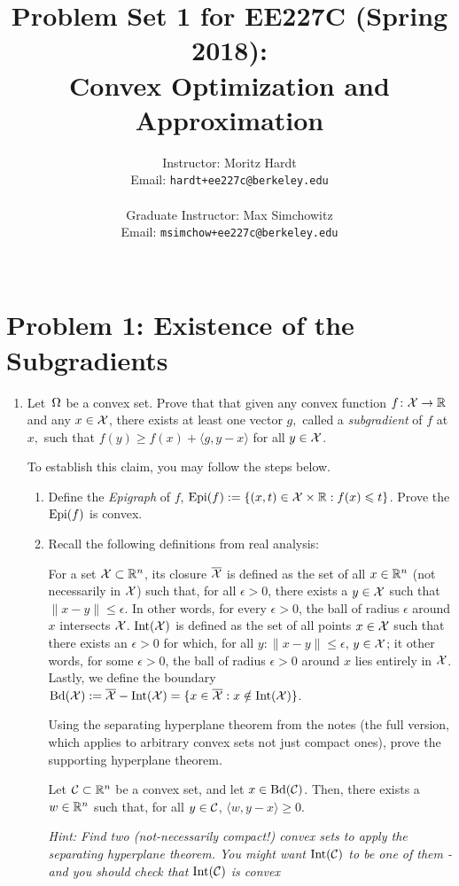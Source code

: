 \documentclass[12pt]{article}
\title{Problem Set 1 for EE227C (Spring 2018):\\
 Convex Optimization and Approximation }
\author{Instructor: Moritz Hardt\\
{\small Email: \tt hardt+ee227c@berkeley.edu}\\ ~\\
Graduate Instructor: Max Simchowitz\\
{\small Email: \tt msimchow+ee227c@berkeley.edu}\\ ~\\
}
\begin{document}


\maketitle

\section*{Problem 1: Existence of the Subgradients}
\begin{enumerate}
\item
Let~$\Omega$ be a convex set. Prove that that given any convex function $f\colon{\cal X} \to
\mathbb{R}$ and any $x \in {\cal X}$, there exists at least one vector $g,$ called a
\emph{subgradient} of $f$ at $x,$ such that $f(y) \ge f(x) + \langle g, y - x
\rangle$ for all $y \in {\cal X}$. 

To establish this claim, you may follow the steps below.

\begin{enumerate}
\item
Define the \emph{Epigraph} of $f$, $\mathrm{Epi}(f) := \{(x,t) \in {\cal X}
\times \mathbb{R}: f(x) \leqslant t\}$. Prove the $\mathrm{Epi}(f)$ is convex. 
\item
Recall the following definitions from real analysis:
%
\begin{definition*} For a set ${\cal X} \subset \mathbb{R}^n$, its
closure $\overline{{\cal X}}$ is defined as the set of all $x \in \mathbb{R}^n$ (not necessarily in ${\cal X}$) such that, for all $\epsilon > 0$, there exists a $y \in {\cal X}$ such that $\|x - y\| \le \epsilon$. In other words, for every $\epsilon > 0$, the ball of radius $\epsilon$ around $x$ intersects ${\cal X}$. $\mathrm{Int}({\cal X})$ is defined as the set of all points $x \in {\cal X}$ such that there exists an $\epsilon > 0$ for which, for all $y: \|x-y\| \le \epsilon$, $y \in {\cal X}$; it other words, for some $\epsilon > 0$, the ball of radius $\epsilon > 0$ around $x$ lies entirely in ${\cal X}$. Lastly, we define the boundary $\mathrm{Bd}({\cal X}) := \overline{{\cal X}} - \mathrm{Int}({\cal X}) = \{x \in \overline{{\cal X}} : x \notin \mathrm{Int}({\cal X})\}$. 
\end{definition*}

Using the separating hyperplane theorem from the notes (the full version, which applies to arbitrary convex sets not just compact ones), prove the supporting hyperplane theorem.
\begin{theorem*} Let ${\cal C} \subset \mathbb{R}^n$ be a convex set,
and let $x \in \mathrm{Bd}({\cal C})$. Then, there exists a $w \in \mathbb{R}^n$ such that, for all $y \in {\cal C}$, $\langle w, y - x \rangle \ge 0$. 
\end{theorem*}
\emph{Hint:  Find two (not-necessarily compact!) convex sets to apply the separating hyperplane theorem. You might want $\mathrm{Int}({\cal C})$ to be one of them - and you should check that $\mathrm{Int}({\cal C})$ is convex } 



\end{enumerate}
\end{enumerate}
\end{document}
